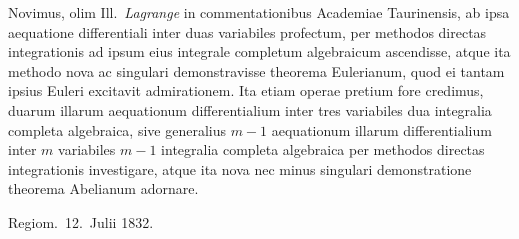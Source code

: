 \documentclass{article}
\begin{document}
Novimus, olim Ill.\ \emph{Lagrange} in commentationibus Academiae Taurinensis, ab ipsa aequatione differentiali inter duas variabiles profectum, per methodos directas integrationis ad ipsum eius integrale completum algebraicum ascendisse, atque ita methodo nova ac singulari demonstravisse theorema Eulerianum, quod ei tantam ipsius Euleri excitavit admirationem. Ita etiam operae pretium fore credimus, duarum illarum aequationum differentialium inter tres variabiles dua integralia completa algebraica, sive generalius $m-1$ aequationum illarum differentialium inter $m$ variabiles $m-1$ integralia completa algebraica per methodos directas integrationis investigare, atque ita nova nec minus singulari demonstratione theorema Abelianum adornare.

Regiom.\ 12.\ Julii 1832.
\end{document}
